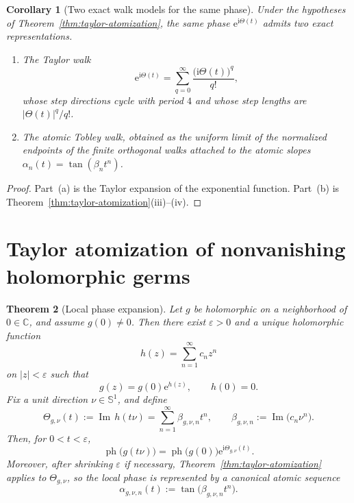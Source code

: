 \documentclass[11pt]{amsart}
\numberwithin{equation}{section}
\newtheorem{theorem}{Theorem}[section]
\newtheorem{corollary}[theorem]{Corollary}
\theoremstyle{definition}
\theoremstyle{remark}
\DeclareMathOperator{\Ima}{Im}
\newcommand{\CC}{\mathbb C}
\newcommand{\Sph}{\mathbb S^1}
\newcommand{\ph}{\operatorname{ph}}
\newcommand{\e}{\mathrm e}
\newcommand{\ii}{\mathrm i}
\begin{document}
\begin{corollary}[Two exact walk models for the same phase]\label{cor:two-walks}
Under the hypotheses of Theorem~\ref{thm:taylor-atomization}, the same phase $\e^{\ii\Theta(t)}$ admits two exact representations.
\begin{enumerate}[label=(\alph*)]
\item The \emph{Taylor walk}
\[
\e^{\ii\Theta(t)}=\sum_{q=0}^{\infty}\frac{\bigl(\ii\Theta(t)\bigr)^q}{q!},
\]
whose step directions cycle with period $4$ and whose step lengths are $|\Theta(t)|^q/q!$.
\item The \emph{atomic Tobley walk}, obtained as the uniform limit of the normalized endpoints of the finite orthogonal walks attached to the atomic slopes $\alpha_n(t)=\tan(\beta_n t^n)$.
\end{enumerate}
\end{corollary}

\begin{proof}
Part~(a) is the Taylor expansion of the exponential function.  Part~(b) is Theorem~\ref{thm:taylor-atomization}(iii)--(iv).
\end{proof}

\section{Taylor atomization of nonvanishing holomorphic germs}

\begin{theorem}[Local phase expansion]\label{thm:nonvanishing-germ}
Let $g$ be holomorphic on a neighborhood of $0\in\CC$, and assume $g(0)\neq0$.  Then there exist $\varepsilon>0$ and a unique holomorphic function
\[
h(z)=\sum_{n=1}^{\infty} c_n z^n
\]
on $|z|<\varepsilon$ such that
\[
g(z)=g(0)\e^{h(z)},
\qquad h(0)=0.
\]
Fix a unit direction $\nu\in\Sph$, and define
\[
\Theta_{g,\nu}(t):=\Ima\,h(t\nu)
=\sum_{n=1}^{\infty}\beta_{g,\nu,n} t^n,
\qquad
\beta_{g,\nu,n}:=\Ima\bigl(c_n\nu^n\bigr).
\]
Then, for $0<t<\varepsilon$,
\[
\ph\bigl(g(t\nu)\bigr)=\ph\bigl(g(0)\bigr)\e^{\ii\Theta_{g,\nu}(t)}.
\]
Moreover, after shrinking $\varepsilon$ if necessary, Theorem~\ref{thm:taylor-atomization} applies to $\Theta_{g,\nu}$, so the local phase is represented by a canonical atomic sequence
\[
\alpha_{g,\nu,n}(t):=\tan\bigl(\beta_{g,\nu,n}t^n\bigr).
\]
\end{theorem}
\end{document}
